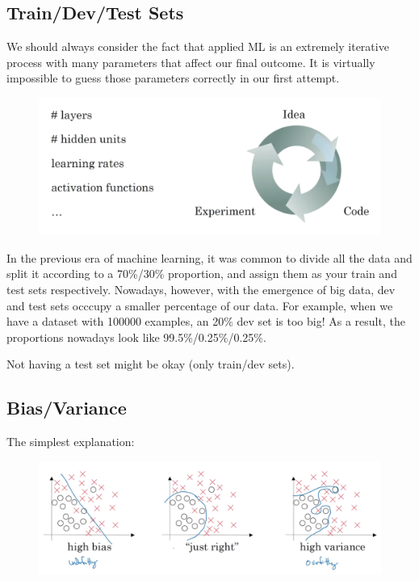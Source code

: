 \subsection{Train/Dev/Test Sets}
We should always consider the fact that applied ML is an extremely iterative process with many parameters that affect our final outcome. It is virtually impossible to guess those parameters correctly in our first attempt. 
\begin{figure}[h]
    \includegraphics[scale=0.2]{images/iterative.png}
    \centering
\end{figure}

In the previous era of machine learning, it was common to divide all the data and split it according to a 70\%/30\% proportion, and assign them as your train and test sets respectively. Nowadays, however, with the emergence of big data, dev and test sets occcupy a smaller percentage of our data. For example, when we have a dataset with 100000 examples, an 20\% dev set is too big! As a result, the proportions nowadays look like 99.5\%/0.25\%/0.25\%. 

Not having a test set might be okay (only train/dev sets). 


\subsection{Bias/Variance}

The simplest explanation:
\begin{figure}[H]
    \includegraphics[scale=0.2]{images/biasvariance.png}
    \centering
\end{figure}

